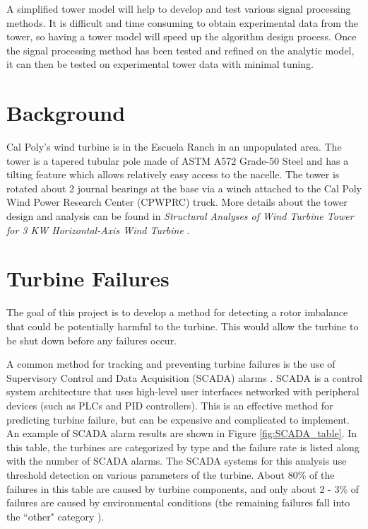 A simplified tower model will help to develop and test various signal processing methods.  It is difficult and time consuming to obtain experimental data from the tower, so having a tower model will speed up the algorithm design process.  Once the signal processing method has been tested and refined on the analytic model, it can then be tested on experimental tower data with minimal tuning.

\section{Background}
Cal Poly’s wind turbine is in the Escuela Ranch in an unpopulated area.  The tower is a tapered tubular pole made of ASTM A572 Grade-50 Steel and has a tilting feature which allows relatively easy access to the nacelle.  The tower is rotated about 2 journal bearings at the base via a winch attached to the Cal Poly Wind Power Research Center (CPWPRC) truck.  More details about the tower design and analysis can be found in \textit{Structural Analyses of Wind Turbine Tower for 3 KW Horizontal-Axis Wind Turbine} \cite{Gwon_paper}.

\section{Turbine Failures}
The goal of this project is to develop a method for detecting a rotor imbalance that could be potentially harmful to the turbine.  This would allow the turbine to be shut down before any failures occur.  

A common method for tracking and preventing turbine failures is the use of Supervisory Control and Data Acquisition (SCADA) alarms \cite{WT_failures_paper}.  SCADA is a control system architecture that uses high-level user interfaces networked with peripheral devices (such as PLCs and PID controllers).  This is an effective method for predicting turbine failure, but can be expensive and complicated to implement.  An example of SCADA alarm results are shown in Figure \ref{fig:SCADA_table}.  In this table, the turbines are categorized by type and the failure rate is listed along with the number of SCADA alarms.  The SCADA systems for this analysis use threshold detection on various parameters of the turbine.  About 80\% of the failures in this table are caused by turbine components, and only about 2 - 3\% of failures are caused by environmental conditions (the remaining failures fall into the ``other" category \cite{wind_turbine_failures}).

